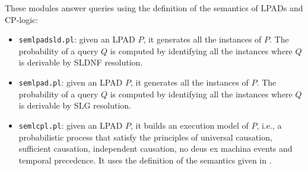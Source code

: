 \documentclass[a4paper,10pt]{article}
\begin{document}
These modules answer queries using the definition of the semantics of LPADs and CP-logic:
\begin{itemize}
\item \texttt{semlpadsld.pl}: given an LPAD $P$, it generates all the instances of $P$. The probability of a query $Q$ is computed by identifying all the instances where $Q$ is derivable by SLDNF resolution.
\item \texttt{semlpad.pl}: given an LPAD $P$, it generates all  the instances of $P$. The probability of a query $Q$ is computed by identifying all the instances where $Q$ is derivable by SLG resolution.
\item \texttt{semlcpl.pl}: given an LPAD $P$,  it builds an execution model of $P$, i.e., a probabilistic process that satisfy the principles of universal causation, sufficient causation, independent causation, no deus ex machina events and temporal precedence. It uses the definition of the semantics given in \cite{DBLP:journals/tplp/VennekensDB09}.
\end{itemize}
\end{document}
